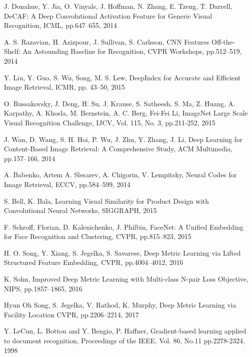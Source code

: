 \documentclass[9pt,technote,compsoc]{./sty/IEEEtran}
\begin{document}
\begin{thebibliography}{1}

J. Donahue, Y. Jia, O. Vinyals, J. Hoffman, N. Zhang, E. Tzeng, T. Darrell,
DeCAF: A Deep Convolutional Activation Feature for Generic Visual Recognition,
ICML, pp.647--655, 2014

A. S. Razavian, H. Azizpour, J. Sullivan, S. Carlsson,
CNN Features Off-the-Shelf: An Astounding Baseline for Recognition,
CVPR Workshops, pp.512--519, 2014

Y. Liu, Y. Guo, S. Wu, Song, M. S. Lew,
DeepIndex for Accurate and Efficient Image Retrieval,
ICMR, pp. 43--50, 2015

O. Russakovsky, J. Deng, H. Su, J. Krause, S. Satheesh, S. Ma,  Z. Huang, A. Karpathy, A. Khosla,
M. Bernstein, A. C. Berg, Fei-Fei Li,
ImageNet Large Scale Visual Recognition Challenge,
IJCV, Vol. 115, No. 3, pp.211-252, 2015

J. Wan, D. Wang, S. H. Hoi, P. Wu, J. Zhu, Y. Zhang, J. Li,
Deep Learning for Content-Based Image Retrieval: A Comprehensive Study,
ACM Multimedia, pp.157--166, 2014

A. Babenko, Artem A. Slesarev, A. Chigorin, V. Lempitsky,
Neural Codes for Image Retrieval,
ECCV, pp.584--599, 2014

S. Bell, K. Bala,
Learning Visual Similarity for Product Design with Convolutional Neural Networks,
SIGGRAPH, 2015

F. Schroff, Florian,  D. Kalenichenko, J. Philbin,
FaceNet: A Unified Embedding for Face Recognition and Clustering,
CVPR, pp.815--823, 2015

H. O. Song,  Y. Xiang,  S. Jegelka, S. Savarese,
Deep Metric Learning via Lifted Structured Feature Embedding,
CVPR, pp.4004--4012, 2016

K. Sohn, Improved Deep Metric Learning with Multi-class N-pair Loss Objective,
NIPS, pp.1857--1865, 2016

Hyun Oh Song, S. Jegelka, V. Rathod, K. Murphy, Deep Metric Learning via Facility Location
CVPR, pp.2206--2214, 2017

Y. LeCun, L. Bottou and Y. Bengio, P. Haffner,
Gradient-based learning applied to document recognition,
Proceedings of the IEEE, Vol. 86, No.11 pp.2278-2324, 1998


\end{thebibliography}
\end{document}
